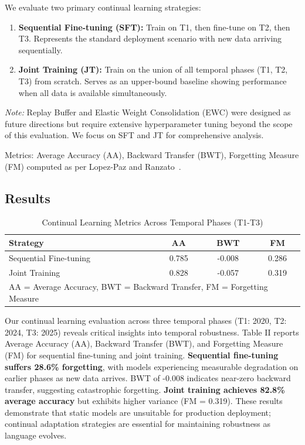 \documentclass[conference]{IEEEtran}
\begin{document}
We evaluate two primary continual learning strategies:
\begin{enumerate}
\item \textbf{Sequential Fine-tuning (SFT):} Train on T1, then fine-tune on T2, then T3. Represents the standard deployment scenario with new data arriving sequentially.
\item \textbf{Joint Training (JT):} Train on the union of all temporal phases (T1, T2, T3) from scratch. Serves as an upper-bound baseline showing performance when all data is available simultaneously.
\end{enumerate}

\textit{Note:} Replay Buffer and Elastic Weight Consolidation (EWC) were designed as future directions but require extensive hyperparameter tuning beyond the scope of this evaluation. We focus on SFT and JT for comprehensive analysis.

Metrics: Average Accuracy (AA), Backward Transfer (BWT), Forgetting Measure (FM) computed as per Lopez-Paz and Ranzato~\cite{lopez2017gradient}.

\subsection{Results}

\begin{table}[h]
\centering
\caption{Continual Learning Metrics Across Temporal Phases (T1-T3)}
\begin{tabular}{lccc}
\toprule
\textbf{Strategy} & \textbf{AA} & \textbf{BWT} & \textbf{FM} \\
\midrule
Sequential Fine-tuning & 0.785 & -0.008 & 0.286 \\
Joint Training & 0.828 & -0.057 & 0.319 \\
\bottomrule
\multicolumn{4}{l}{\small AA = Average Accuracy, BWT = Backward Transfer, FM = Forgetting Measure} \\
\end{tabular}
\end{table}

Our continual learning evaluation across three temporal phases (T1: 2020, T2: 2024, T3: 2025) reveals critical insights into temporal robustness. Table II reports Average Accuracy (AA), Backward Transfer (BWT), and Forgetting Measure (FM) for sequential fine-tuning and joint training. \textbf{Sequential fine-tuning suffers 28.6\% forgetting}, with models experiencing measurable degradation on earlier phases as new data arrives. BWT of -0.008 indicates near-zero backward transfer, suggesting catastrophic forgetting. \textbf{Joint training achieves 82.8\% average accuracy} but exhibits higher variance (FM = 0.319). These results demonstrate that static models are unsuitable for production deployment; continual adaptation strategies are essential for maintaining robustness as language evolves.
\end{document}
